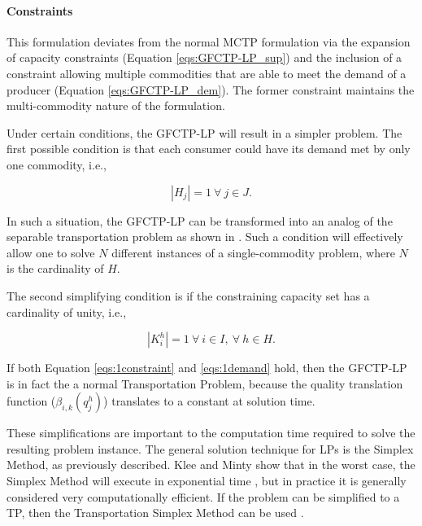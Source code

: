 \paragraph{Constraints}
This formulation deviates from the normal MCTP formulation via the expansion of
capacity constraints (Equation \ref{eqs:GFCTP-LP_sup}) and the inclusion of a
constraint allowing multiple commodities that are able to meet the demand of a
producer (Equation \ref{eqs:GFCTP-LP_dem}). The former constraint maintains the
multi-commodity nature of the formulation. 

Under certain conditions, the GFCTP-LP will result in a simpler problem. The
first possible condition is that each consumer could have its demand met by only
one commodity, i.e.,

\begin{equation}\label{eqs:1demand}
  \left|{H_{j}}\right| = 1 \: \forall \: j \in J.
\end{equation}

In such a situation, the GFCTP-LP can be transformed into an analog of the
separable transportation problem as shown in \cite{bertsekas_network_1998}. Such
a condition will effectively allow one to solve $N$ different instances of a
single-commodity problem, where $N$ is the cardinality of $H$. 

The second simplifying condition is if the constraining capacity set has a
cardinality of unity, i.e., 

\begin{equation}\label{eqs:1constraint}
  \left|{K_{i}^{h}}\right| = 1 \: \forall \: i \in I, \: \forall \: h \in H.
\end{equation}

If both Equation \ref{eqs:1constraint} and \ref{eqs:1demand} hold, then the
GFCTP-LP is in fact the a normal Transportation Problem, because the quality
translation function ($\beta_{i,k}(q_{j}^{h})$) translates to a constant at
solution time. 

These simplifications are important to the computation time required to solve
the resulting problem instance. The general solution technique for LPs is the
Simplex Method, as previously described. Klee and Minty show that in the worst
case, the Simplex Method will execute in exponential time \cite{klee_good_1970},
but in practice it is generally considered very computationally efficient. If
the problem can be simplified to a TP, then the Transportation Simplex Method
can be used \cite{ahuja_network_1993}.

